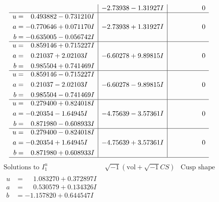 \documentclass[1p]{elsarticle_modified}
\theoremstyle{definition}
\newcommand{\I}{\sqrt{-1}}
\begin{document}
$$\begin{array}{c|c|c}
 & -2.73938 - 1.31927 I & \phantom{-0.000000 } 0 \\ \hline\begin{aligned}
u &= \phantom{-}0.493882 - 0.731210 I \\
a &= -0.770646 + 0.071170 I \\
b &= -0.635005 - 0.056742 I\end{aligned}
 & -2.73938 + 1.31927 I & \phantom{-0.000000 } 0 \\ \hline\begin{aligned}
u &= \phantom{-}0.859146 + 0.715227 I \\
a &= \phantom{-}0.21037 + 2.02103 I \\
b &= \phantom{-}0.985504 + 0.741469 I\end{aligned}
 & -6.60278 + 9.89815 I & \phantom{-0.000000 } 0 \\ \hline\begin{aligned}
u &= \phantom{-}0.859146 - 0.715227 I \\
a &= \phantom{-}0.21037 - 2.02103 I \\
b &= \phantom{-}0.985504 - 0.741469 I\end{aligned}
 & -6.60278 - 9.89815 I & \phantom{-0.000000 } 0 \\ \hline\begin{aligned}
u &= \phantom{-}0.279400 + 0.824018 I \\
a &= -0.20354 - 1.64945 I \\
b &= \phantom{-}0.871980 - 0.608933 I\end{aligned}
 & -4.75639 - 3.57361 I & \phantom{-0.000000 } 0 \\ \hline\begin{aligned}
u &= \phantom{-}0.279400 - 0.824018 I \\
a &= -0.20354 + 1.64945 I \\
b &= \phantom{-}0.871980 + 0.608933 I\end{aligned}
 & -4.75639 + 3.57361 I & \phantom{-0.000000 } 0\\
 \hline 
 \end{array}$$\newpage$$\begin{array}{c|c|c}  
\text{Solutions to }I^u_{1}& \I (\text{vol} + \sqrt{-1}CS) & \text{Cusp shape}\\
 \hline 
\begin{aligned}
u &= \phantom{-}1.083270 + 0.372897 I \\
a &= \phantom{-}0.530579 + 0.134326 I \\
b &= -1.157820 + 0.644547 I\end{aligned}

\end{array}$$
\end{document}
